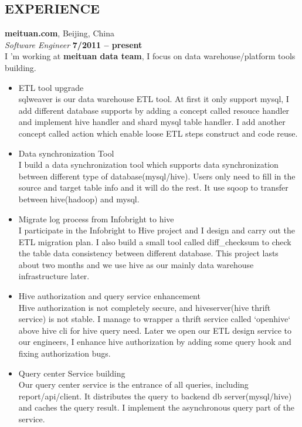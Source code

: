 \documentclass[margin,line]{resume}
\begin{document}
\begin{resume}
\sectionline

    \section{\mysidestyle \textbf{\large{E}\small{XPERIENCE}}}
    \textbf{\listing meituan.com}, Beijing, China \vspace{2mm}\\\vspace{1mm}%
    \textsl{Software Engineer} \hfill \textbf{ 7/2011 -- present}\\
    I 'm working at \textbf{meituan data team}, I focus on data warehouse/platform tools building.\vspace{0.6mm}

    \begin{itemize}[leftmargin=3mm]
        \item ETL tool upgrade\\
      sqlweaver is our data warehouse ETL tool. At first it only support mysql, I add different database supports by adding a concept called resouce handler and implement hive handler and shard mysql table handler. I add another concept called action which enable loose ETL steps construct and code reuse. 
        \item Data synchronization Tool\\
    I build a data synchronization tool which supports data synchronization between different type of database(mysql/hive). Users only need to fill in the source and target table info and it will do the rest. It use sqoop to transfer between hive(hadoop) and mysql.
        \item Migrate log process from Infobright to hive\\
        I participate in the Infobright to Hive project and I design and carry out the ETL migration plan. I also build a small tool called diff\_checksum to check the table data consistency between different database. This project lasts about two months and we use hive as our mainly data warehouse infrastructure later.
        \item Hive authorization and query service enhancement\\
        Hive authorization is not completely secure, and hiveserver(hive thrift service) is not stable. I manage to wrapper a thrift service called `openhive` above hive cli for hive query need. Later we open our ETL design service to our engineers, I enhance hive authorization by adding some query hook and fixing authorization bugs.
        \item Query center Service building\\
        Our query center service is the entrance of all queries, including report/api/client. It distributes the query to backend db server(mysql/hive) and caches the query result. I implement the asynchronous query part of the service.


\end{itemize}
\end{resume}
\end{document}
